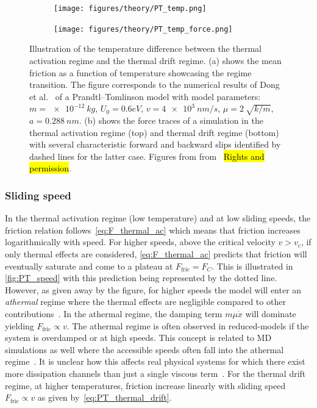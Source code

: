 \begin{figure}[H]
  \centering
  \begin{subfigure}[t]{0.49\textwidth}
      \centering
      \texttt{[image: figures/theory/PT\_temp.png]}
      \caption{}
      \label{fig:PT_temp_a}
  \end{subfigure}
  \hfill
  \begin{subfigure}[t]{0.49\textwidth}
      \centering
      \texttt{[image: figures/theory/PT\_temp\_force.png]}
      \caption{}
      \label{fig:PT_temp_b}
  \end{subfigure}
  \hfill
  \hfill
     \caption{Illustration of the temperature difference between the thermal activation regime and the thermal drift regime. (a) shows the mean friction as a function of temperature showcasing the regime transition. The figure corresponds to the numerical results of Dong et al.~\cite{Yalin_2011} of a Prandtl–Tomlinson model with model parameters: $m=\SI{e-12}{kg}$, $U_0={0.6}{eV}$, $v=\SI{4e3}{nm/s}$, $\mu=\SI{2}{\sqrt{k/m}}$, $a=\SI{0.288}{nm}$. (b) shows the force traces of a simulation in the thermal activation regime (top) and thermal drift regime (bottom) with several characteristic forward and backward slips identified by dashed lines for the latter case. Figures from from~\cite{Yalin_2011} \hl{Rights and permission}.}
     \label{fig:PT_temp}
\end{figure}



\subsubsection{Sliding speed}
In the thermal activation regime (low temperature) and at low sliding speeds, the
friction relation follows~\cref{eq:F_thermal_ac} which means that friction
increases logarithmically with speed. For higher speeds, above the critical
velocity $v > v_c$, if only thermal effects are considered,
\cref{eq:F_thermal_ac} predicts that friction will eventually saturate and come
to a plateau at $F_{\text{fric}} = F_C$. This is illustrated in
\cref{fig:PT_speed} with this prediction being represented by the dotted line.
However, as given away by the figure, for higher speeds the model will enter an
\textit{athermal} regime where the thermal effects are negligible compared to
other contributions~\cite{PhysRevLett.89.224301}. In the athermal regime, the
damping term $m\mu \dot{x}$ will dominate yielding $F_{\text{fric}}\propto v$.
The athermal regime is often observed in reduced-models if the system is
overdamped or at high speeds. This concept is related to \acrshort{MD}
simulations as well where the accessible speeds often fall into the athermal
regime~\cite{Li_2011}. It is unclear how this affects real physical systems for
which there exist more dissipation channels than just a single viscous
term~\cite{Dong_2013}. For the thermal drift regime, at higher temperatures, friction increase linearly with sliding speed $F_{\text{fric}} \propto v$ as given by~\cref{eq:PT_thermal_drift}.

